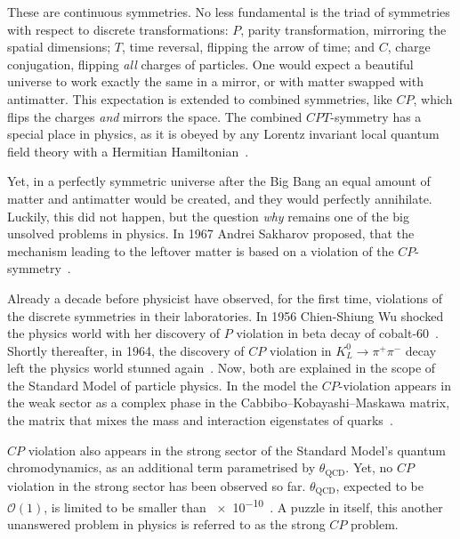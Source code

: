 These are continuous symmetries. No less fundamental is the triad of symmetries with respect to discrete transformations: $P$, parity transformation, mirroring the spatial dimensions; $T$, time reversal, flipping the arrow of time; and $C$, charge conjugation, flipping \emph{all} charges of particles. One would expect a beautiful universe to work exactly the same in a mirror, or with matter swapped with antimatter. This expectation is extended to combined symmetries, like $CP$, which flips the charges \emph{and} mirrors the space. The combined $CPT$-symmetry has a special place in physics, as it is obeyed by any Lorentz invariant local quantum field theory with a Hermitian Hamiltonian~\cite{Sachs1987}.

Yet, in a perfectly symmetric universe after the Big Bang an equal amount of matter and antimatter would be created, and they would perfectly annihilate. Luckily, this did not happen, but the question \emph{why} remains one of the big unsolved problems in physics.
In 1967 Andrei Sakharov proposed, that the mechanism leading to the leftover matter  is based on a violation of the $CP$-symmetry~\cite{0038-5670-34-5-A08}.

Already a decade before physicist have observed, for the first time, violations of the discrete symmetries in their laboratories.
In 1956 Chien-Shiung Wu shocked the physics world with her discovery of $P$ violation in beta decay of cobalt-60~\cite{PhysRev.105.1413}. Shortly thereafter, in 1964, the discovery of $CP$ violation in $K^0_L \rightarrow \pi^+ \pi^-$ decay left the physics world stunned again~\cite{PhysRevLett.13.138}. Now, both are explained in the scope of the Standard Model of particle physics. In the model the $CP$-violation appears in the weak sector as a complex phase in the Cabbibo--Kobayashi--Maskawa matrix, the matrix that mixes the mass and interaction eigenstates of quarks~\cite{doi:10.1143/PTP.49.652}.

$CP$ violation also appears in the strong sector of the Standard Model's quantum chromodynamics, as an additional term parametrised by $\theta_\text{QCD}$. Yet, no $CP$ violation in the strong sector has been observed so far. $\theta_\text{QCD}$, expected to be $\mathcal{O}(1)$, is limited to be smaller than \num{e-10}~\cite{PDG2016}. A puzzle in itself, this another unanswered problem in physics is referred to as the strong $CP$ problem.

